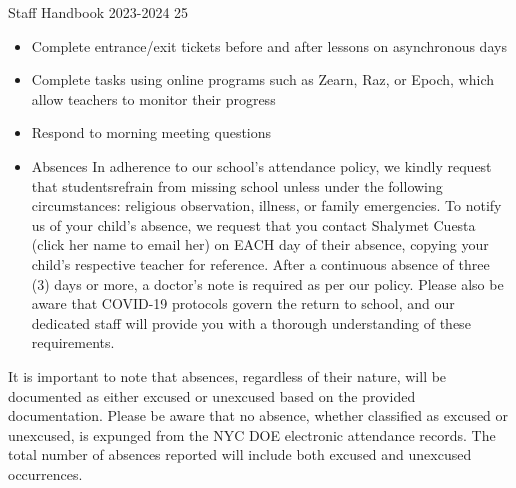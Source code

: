 \documentclass[letterpaper, 11pt]{article}
\begin{document}
Staff Handbook 2023-2024 25
\begin{itemize}
\item Complete entrance/exit tickets before and after lessons on asynchronous days
\item Complete tasks using online programs such as Zearn, Raz, or Epoch, which allow teachers to monitor their progress
\item Respond to morning meeting questions
\item Absences In adherence to our school’s attendance policy, we kindly request that studentsrefrain from missing school unless under the following circumstances: religious observation, illness, or family emergencies. To notify us of your child’s absence, we request that you contact Shalymet Cuesta (click her name to email her) on EACH day of their absence, copying your child’s respective teacher for reference. After a continuous absence of three (3) days or more, a doctor’s note is required as per our policy. Please also be aware that COVID-19 protocols govern the return to school, and our dedicated staff will provide you with a thorough understanding of these requirements.
\end{itemize}

It is important to note that absences, regardless of their nature, will be documented as either excused or unexcused based on the provided documentation. Please be aware that no absence, whether classified as excused or unexcused, is expunged from the NYC DOE electronic attendance records. The total number of absences reported will include both excused and unexcused occurrences.
\end{document}
